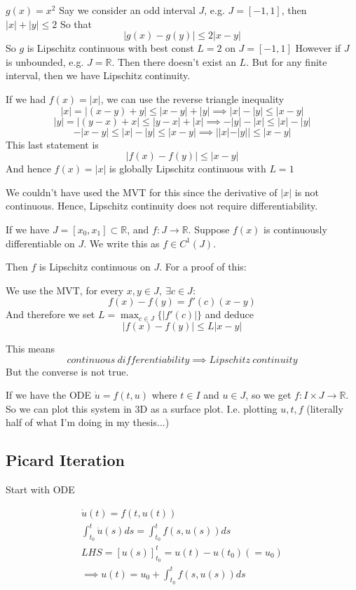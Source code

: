\documentclass{/home/janmebows/Documents/LatexTemplates/myassignment}
\begin{document}
$g(x) = x^2$
Say we consider an odd interval $J$, e.g. $J=[-1,1]$, then $|x| + |y| \leq 2$
So that
\[|g(x)-g(y)| \leq 2 |x-y|\]
So $g$ is Lipschitz continuous with best const $L=2$ on $J=[-1,1]$
However if $J$ is unbounded, e.g. $J =\mathbb{R}$. Then there doesn't exist an $L$.
But for any finite interval, then we have Lipschitz continuity.

If we had $f(x) = |x|$, we can use the reverse triangle inequality
\[|x| = |(x-y)+y| \leq |x-y| +|y| \implies |x|-|y| \leq |x-y|\]
\[|y| = |(y-x)+x| \leq |y-x| +|x| \implies -|y|-|x|\leq |x|-|y| \]
\[-|x-y| \leq |x|-|y| \leq |x-y| \implies ||x|-|y|| \leq |x-y|\]
This last statement is 
\[|f(x) - f(y)| \leq |x-y|\]
And hence $f(x) = |x|$ is globally Lipschitz continuous with $L=1$


We couldn't have used the MVT for this since the derivative of $|x|$ is not continuous. Hence, Lipschitz continuity does not require differentiability.

If we have $J=[x_0,x_1] \subset \mathbb{R}$, and $f : J\to \mathbb{R}$. Suppose $f(x)$ is continuously differentiable on $J$. We write this as $f \in C^1(J)$.

Then $f$ is Lipschitz continuous on $J$. For a proof of this:

We use the MVT, for every $x,y \in J, \ \exists c \in J:$
\[f(x) - f(y) = f'(c) (x-y)\]
And therefore we set $L = \max_{c\in J}\{|f'(c)|\}$  and deduce
\[|f(x) - f(y)| \leq L |x-y|\]

This means 
\[continuous\ differentiability \implies Lipschitz \ continuity\]
But the converse is not true.


If we have the ODE $\dot u = f(t,u)$ where $t \in I$ and $u \in J$, so we get $f:I\times J \to \mathbb{R}$. So we can plot this system in 3D as a surface plot. I.e. plotting $u,t,f$ (literally half of what I'm doing in my thesis...)

\subsection{Picard Iteration}
Start with ODE

\begin{align*}
    \dot u(t) = f(t,u(t))\\
    \int_{t_0}^t \dot u(s) ds = \int_{t_0}^t f(s,u(s))ds\\
    LHS =\left[u(s)\right]_{t_0}^{t} = u(t) - u(t_0)(=u_0)\\
    \implies u(t) = u_0 + \int_{t_0}^t f(s,u(s))ds
\end{align*}
\end{document}
